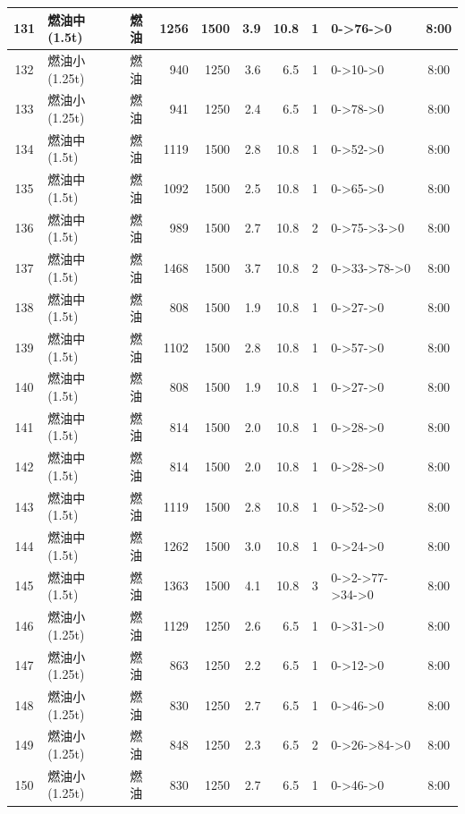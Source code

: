 \begin{landscape}
\begin{longtable}{|c|l|c|r|r|r|r|c|p{2.8cm}|c|}
\hline
\rowcolor{gray!8}
131 & 燃油中(1.5t) & 燃油 & 1256 & 1500 & 3.9 & 10.8 & 1 & 0->76->0 & 8:00 \\
\hline
132 & 燃油小(1.25t) & 燃油 & 940 & 1250 & 3.6 & 6.5 & 1 & 0->10->0 & 8:00 \\
\hline
\rowcolor{gray!8}
133 & 燃油小(1.25t) & 燃油 & 941 & 1250 & 2.4 & 6.5 & 1 & 0->78->0 & 8:00 \\
\hline
134 & 燃油中(1.5t) & 燃油 & 1119 & 1500 & 2.8 & 10.8 & 1 & 0->52->0 & 8:00 \\
\hline
\rowcolor{gray!8}
135 & 燃油中(1.5t) & 燃油 & 1092 & 1500 & 2.5 & 10.8 & 1 & 0->65->0 & 8:00 \\
\hline
136 & 燃油中(1.5t) & 燃油 & 989 & 1500 & 2.7 & 10.8 & 2 & 0->75->3->0 & 8:00 \\
\hline
\rowcolor{gray!8}
137 & 燃油中(1.5t) & 燃油 & 1468 & 1500 & 3.7 & 10.8 & 2 & 0->33->78->0 & 8:00 \\
\hline
138 & 燃油中(1.5t) & 燃油 & 808 & 1500 & 1.9 & 10.8 & 1 & 0->27->0 & 8:00 \\
\hline
\rowcolor{gray!8}
139 & 燃油中(1.5t) & 燃油 & 1102 & 1500 & 2.8 & 10.8 & 1 & 0->57->0 & 8:00 \\
\hline
140 & 燃油中(1.5t) & 燃油 & 808 & 1500 & 1.9 & 10.8 & 1 & 0->27->0 & 8:00 \\
\hline
\rowcolor{gray!8}
141 & 燃油中(1.5t) & 燃油 & 814 & 1500 & 2.0 & 10.8 & 1 & 0->28->0 & 8:00 \\
\hline
142 & 燃油中(1.5t) & 燃油 & 814 & 1500 & 2.0 & 10.8 & 1 & 0->28->0 & 8:00 \\
\hline
\rowcolor{gray!8}
143 & 燃油中(1.5t) & 燃油 & 1119 & 1500 & 2.8 & 10.8 & 1 & 0->52->0 & 8:00 \\
\hline
144 & 燃油中(1.5t) & 燃油 & 1262 & 1500 & 3.0 & 10.8 & 1 & 0->24->0 & 8:00 \\
\hline
\rowcolor{gray!8}
145 & 燃油中(1.5t) & 燃油 & 1363 & 1500 & 4.1 & 10.8 & 3 & 0->2->77->34->0 & 8:00 \\
\hline
146 & 燃油小(1.25t) & 燃油 & 1129 & 1250 & 2.6 & 6.5 & 1 & 0->31->0 & 8:00 \\
\hline
\rowcolor{gray!8}
147 & 燃油小(1.25t) & 燃油 & 863 & 1250 & 2.2 & 6.5 & 1 & 0->12->0 & 8:00 \\
\hline
148 & 燃油小(1.25t) & 燃油 & 830 & 1250 & 2.7 & 6.5 & 1 & 0->46->0 & 8:00 \\
\hline
\rowcolor{gray!8}
149 & 燃油小(1.25t) & 燃油 & 848 & 1250 & 2.3 & 6.5 & 2 & 0->26->84->0 & 8:00 \\
\hline
150 & 燃油小(1.25t) & 燃油 & 830 & 1250 & 2.7 & 6.5 & 1 & 0->46->0 & 8:00 \\

\end{longtable}
\end{landscape}
